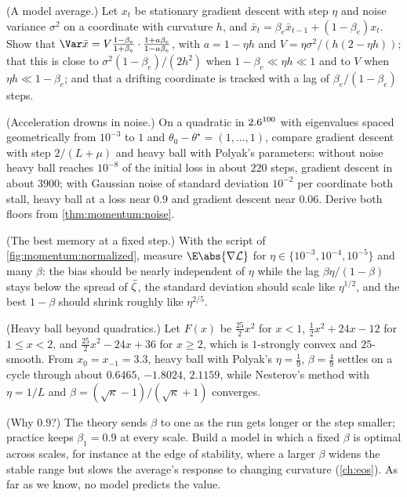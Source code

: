 \begin{refsection}
\begin{exercises}
\item \variation (A model average.) Let $x_t$ be stationary gradient descent with step $\eta$ and noise variance $\sigma^2$ on a coordinate with curvature $h$, and $\bar x_t=\beta_e\bar x_{t-1}+(1-\beta_e)x_t$. Show that $\Var\bar x=V\frac{1-\beta_e}{1+\beta_e}\cdot\frac{1+a\beta_e}{1-a\beta_e}$, with $a=1-\eta h$ and $V=\eta\sigma^2/(h(2-\eta h))$; that this is close to $\sigma^2(1-\beta_e)/(2h^2)$ when $1-\beta_e\ll\eta h\ll1$ and to $V$ when $\eta h\ll1-\beta_e$; and that a drifting coordinate is tracked with a lag of $\beta_e/(1-\beta_e)$ steps.\label{ex:momentum:modelema}

\item \simulation (Acceleration drowns in noise.) On a quadratic in $2.6^{100}$ with eigenvalues spaced geometrically from $10^{-3}$ to $1$ and $\theta_0-\theta^\star=(1,\dots,1)$, compare gradient descent with step $2/(L+\mu)$ and heavy ball with Polyak's parameters: without noise heavy ball reaches $10^{-8}$ of the initial loss in about $220$ steps, gradient descent in about $3900$; with Gaussian noise of standard deviation $10^{-2}$ per coordinate both stall, heavy ball at a loss near $0.9$ and gradient descent near $0.06$. Derive both floors from \cref{thm:momentum:noise}.\label{ex:momentum:noisyaccel}

\item \simulation (The best memory at a fixed step.) With the script of \cref{fig:momentum:normalized}, measure $\E\abs{\nabla\Loss}$ for $\eta\in\{10^{-3},10^{-4},10^{-5}\}$ and many $\beta$: the bias should be nearly independent of $\eta$ while the lag $\beta\eta/(1-\beta)$ stays below the spread of $\bar\zeta$, the standard deviation should scale like $\eta^{1/2}$, and the best $1-\beta$ should shrink roughly like $\eta^{2/5}$.\label{ex:momentum:bestbeta}

\item \simulation (Heavy ball beyond quadratics.) Let $F(x)$ be $\frac{25}2x^2$ for $x<1$, $\frac12x^2+24x-12$ for $1\le x<2$, and $\frac{25}2x^2-24x+36$ for $x\ge2$, which is $1$-strongly convex and $25$-smooth. From $x_0=x_{-1}=3.3$, heavy ball with Polyak's $\eta=\frac19$, $\beta=\frac49$ settles on a cycle through about $0.6465$, $-1.8024$, $2.1159$, while Nesterov's method with $\eta=1/L$ and $\beta=(\sqrt\kappa-1)/(\sqrt\kappa+1)$ converges.\label{ex:momentum:lessard}

\item \research (Why $0.9$?) The theory sends $\beta$ to one as the run gets longer or the step smaller; practice keeps $\beta_1=0.9$ at every scale. Build a model in which a fixed $\beta$ is optimal across scales, for instance at the edge of stability, where a larger $\beta$ widens the stable range but slows the average's response to changing curvature (\cref{ch:eos}). As far as we know, no model predicts the value.\label{ex:momentum:why}


\end{exercises}
\end{refsection}
